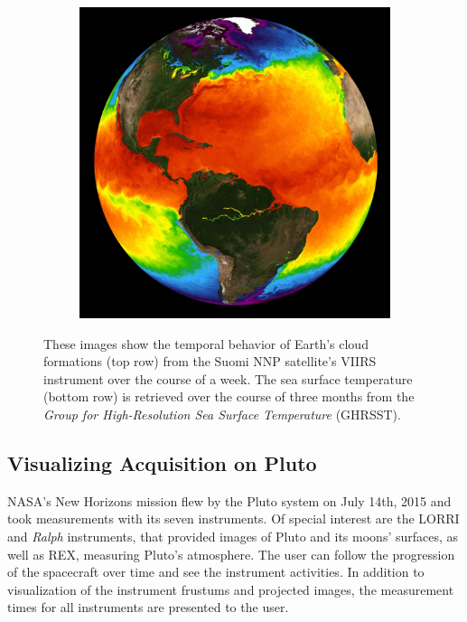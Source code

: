 \documentclass[journal]{vgtc}                %
\begin{document}
\begin{figure}[b]
\begin{subfigure}[tb]{0.32\linewidth}
	\end{subfigure}
    \begin{subfigure}[tb]{0.32\linewidth}
    	\includegraphics[width=\textwidth]{earth_temporal/earth_temporal_sea_surface3.png}
	\end{subfigure}
    \caption{These images show the temporal behavior of Earth's cloud formations (top row) from the Suomi NNP satellite's VIIRS instrument over the course of a week. The sea surface temperature (bottom row) is retrieved over the course of three months from the \emph{Group for High-Resolution Sea Surface Temperature} (GHRSST).}  \vspace{-4mm}
    \label{fig:temporal_earth}
\end{figure}

\fi

\subsection{Visualizing Acquisition on Pluto}
NASA's New Horizons mission flew by the Pluto system on July 14th, 2015 and took measurements with its seven instruments.
Of special interest are the LORRI and \emph{Ralph} instruments, that provided images of Pluto and its moons' surfaces, as well as REX, measuring Pluto's atmosphere.
The user can follow the progression of the spacecraft over time and see the instrument activities.
In addition to visualization of the instrument frustums and projected images, the measurement times for all instruments are presented to the user. 
\end{document}
